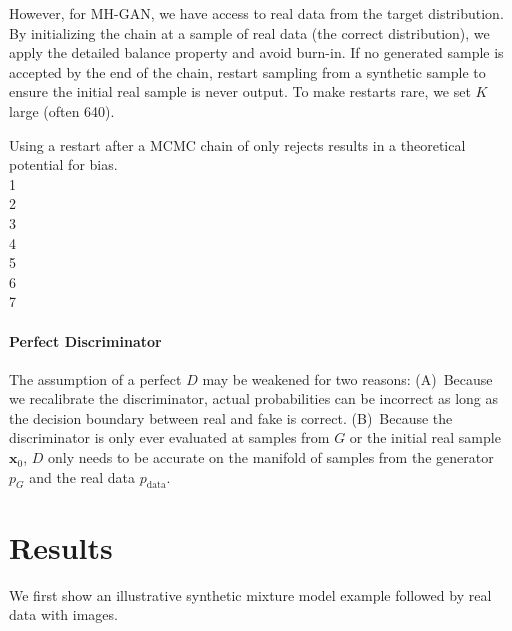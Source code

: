 \documentclass{article}
\renewcommand{\vec}[1]{{\boldsymbol{\mathbf{#1}}}} %
\newcommand{\PG}{{p_G}}
\newcommand{\PR}{{p_{\textrm{data}}}}
\begin{document}
However, for MH-GAN, we have access to real data from the target distribution.
By initializing the chain at a sample of real data (the correct distribution), we apply the detailed balance property and avoid burn-in.
If no generated sample is accepted by the end of the chain, restart sampling from a synthetic sample to ensure the initial real sample is never output.
To make restarts rare, we set $K$ large (often 640)\@.

Using a restart after a MCMC chain of only rejects results in a theoretical potential for bias.\\
1\\ %
2\\
3\\
4\\
5\\
6\\
7

\paragraph{Perfect Discriminator}
The assumption of a perfect $D$ may be weakened for two reasons:
(A)~Because we recalibrate the discriminator, actual probabilities can be incorrect as long as the decision boundary between real and fake is correct.
(B)~Because the discriminator is only ever evaluated at samples from $G$ or the initial real sample $\vec x_0$, $D$ only needs to be accurate on the manifold of samples from the generator $\PG$ and the real data $\PR$.





\section{Results}
\label{sec:Results}

We first show an illustrative synthetic mixture model example followed by real data with images.
\end{document}
